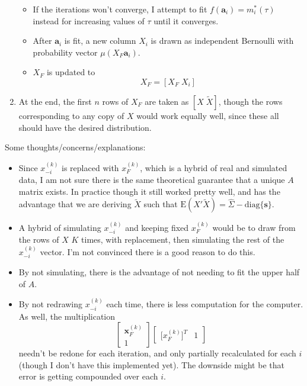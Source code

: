 \documentclass[11pt]{article}
\newcommand{\E}{\mathrm{E}}
\newcommand{\diag}[1]{\mathrm{diag}\{#1\}}
\theoremstyle{definition}
\begin{document}
\begin{enumerate}
\begin{itemize}
                    \item If the iterations won't converge, I attempt to fit $f(\mathbf a_i)=m_i^*(\tau)$ instead for increasing values of $\tau$ until it converges.
                    \item After $\mathbf a_i$ is fit, a new column $X_i$ is drawn as independent Bernoulli with probability vector $\mu(X_F \mathbf a_i)$.   
                    \item $X_F$ is updated to 
                    \[ X_F = [X_F \; X_i] \]
                \end{itemize}
            \item At the end, the first $n$ rows of $X_F$ are taken as $[X \; \tilde X]$, though the rows corresponding to any copy of $X$ would work equally well, since these all should have the desired distribution.
        \end{enumerate}
        Some thoughts/concerns/explanations:
        \begin{itemize}
            \item Since $x_{-i}^{(k)}$ is replaced with $x_F^{(k)}$, which is a hybrid of real and simulated data, I am not sure there is the same theoretical guarantee that a unique $A$ matrix exists. In practice though it still worked pretty well, and has the advantage that we are deriving $\tilde X$ such that $\E(X'\tilde X) = \hat \Sigma- \diag{\mathbf s}$.
            \item A hybrid of simulating $x_{-i}^{(k)}$ and keeping fixed $x_F^{(k)}$ would be to draw from the rows of $X$ $K$ times, with replacement, then simulating the rest of the $x_{-i}^{(k)}$ vector. I'm not convinced there is a good reason to do this. 
            \item By not simulating, there is the advantage of not needing to fit the upper half of $A$.
            \item By not redrawing $x_{-i}^{(k)}$ each time, there is less computation for the computer. As well, the multiplication
                \[ \left[\begin{array}{c} \mathbf x_F^{(k)} \\ 1 \end{array}\right]\left[\begin{array}{cc} \mathbf [x_F^{(k)}]^T & 1 \end{array}\right] \]
            needn't be redone for each iteration, and only partially recalculated for each $i$ (though I don't have this implemented yet). The downside might be that error is getting compounded over each $i$.
        \end{itemize}
\end{document}
